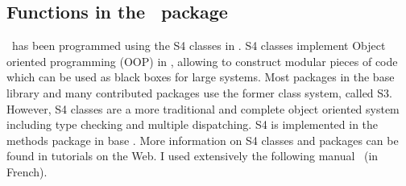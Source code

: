 \subsection{Functions in the \npde~package} \label{sec:npde.methods}

\hskip 18pt \npde~has been programmed using the S4 classes in \R. S4 classes implement Object oriented programming (OOP) in \R, allowing to construct modular pieces of code which can be used as black boxes for large systems. Most packages in the base library and many contributed packages use the former class system, called S3. However, S4 classes are a more traditional and complete object oriented system including type checking and multiple dispatching. S4 is implemented in the methods package in base \R. More information on S4 classes and \R packages can be found in tutorials on the Web. I used extensively the following manual~\cite{Genolini} (in French).

